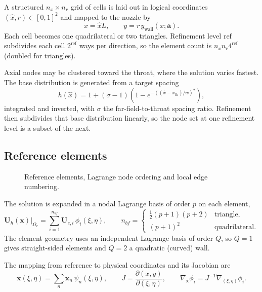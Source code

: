 \documentclass[11pt,a4paper]{article}
\newcommand{\vect}[1]{\boldsymbol{#1}}
\newcommand{\Uvec}{\vect{U}}
\newcommand{\xvec}{\vect{x}}
\newcommand{\avec}{\vect{a}}
\begin{document}
A structured $n_x \times n_r$ grid of cells is laid out in logical coordinates
$(\hat{x}, r) \in [0,1]^2$ and mapped to the nozzle by
\begin{equation}
  x = \hat{x} L, \qquad y = r\, y_{\mathrm{wall}}(x; \avec).
  \label{eq:meshmap}
\end{equation}
Each cell becomes one quadrilateral or two triangles.  Refinement level
$\mathrm{ref}$ subdivides each cell $2^{\mathrm{ref}}$ ways per direction, so the
element count is $n_x n_r 4^{\mathrm{ref}}$ (doubled for triangles).

Axial nodes may be clustered toward the throat, where the solution varies
fastest.  The base distribution is generated from a target spacing
\begin{equation}
  h(\hat{x}) = 1 + (\sigma - 1)
    \left(1 - e^{-\left((\hat{x} - x_{\mathrm{th}})/w\right)^{2}}\right),
\end{equation}
integrated and inverted, with $\sigma$ the far-field-to-throat spacing ratio.
Refinement then subdivides that base distribution linearly, so the node set at
one refinement level is a subset of the next.

\subsection{Reference elements}

\begin{figure}[H]
  \centering
  \resizebox{\textwidth}{!}{}
  \caption{Reference elements, Lagrange node ordering and local edge numbering.}
  \label{fig:refelem}
\end{figure}

The solution is expanded in a nodal Lagrange basis of order $p$ on each element,
\begin{equation}
  \Uvec_h(\xvec)\big|_{\Omega_e}
  = \sum_{i=1}^{n_{bf}} \Uvec_{e,i}\, \phi_i(\xi, \eta),
  \qquad
  n_{bf} =
  \begin{cases}
    \tfrac{1}{2}(p+1)(p+2) & \text{triangle},\\[2pt]
    (p+1)^{2}              & \text{quadrilateral}.
  \end{cases}
\end{equation}
The element geometry uses an independent Lagrange basis of order $Q$, so $Q = 1$
gives straight-sided elements and $Q = 2$ a quadratic (curved) wall.

The mapping from reference to physical coordinates and its Jacobian are
\begin{equation}
  \xvec(\xi,\eta) = \sum_{n} \xvec_n\, \psi_n(\xi,\eta),
  \qquad
  J = \frac{\partial(x,y)}{\partial(\xi,\eta)},
  \qquad
  \nabla_{\xvec}\phi_i = J^{-T}\nabla_{(\xi,\eta)}\phi_i .
\end{equation}
\end{document}

